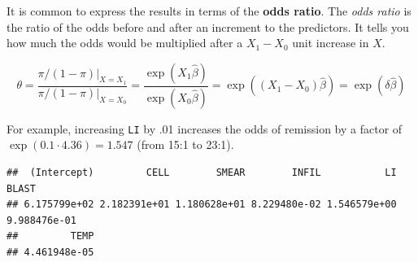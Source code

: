 \documentclass[
]{book}
\newenvironment{Shaded}{\begin{snugshade}}{\end{snugshade}}
\newcommand{\DataTypeTok}[1]{\textcolor[rgb]{0.13,0.29,0.53}{#1}}
\newcommand{\DecValTok}[1]{\textcolor[rgb]{0.00,0.00,0.81}{#1}}
\newcommand{\KeywordTok}[1]{\textcolor[rgb]{0.13,0.29,0.53}{\textbf{#1}}}
\newcommand{\NormalTok}[1]{#1}
\newcommand{\OperatorTok}[1]{\textcolor[rgb]{0.81,0.36,0.00}{\textbf{#1}}}
\newcommand{\StringTok}[1]{\textcolor[rgb]{0.31,0.60,0.02}{#1}}
\begin{document}
\begin{Shaded}
\end{Shaded}

It is common to express the results in terms of the \textbf{odds ratio}. The \emph{odds ratio} is the ratio of the odds before and after an increment to the predictors. It tells you how much the odds would be multiplied after a \(X_1 - X_0\) unit increase in \(X\).

\[\theta = \frac{\pi / (1 - \pi) |_{X = X_1}}{\pi / (1 - \pi) |_{X = X_0}} = \frac{\exp (X_1 \hat{\beta})}{\exp (X_0 \hat{\beta})} = \exp ((X_1-X_0) \hat{\beta}) = \exp (\delta \hat{\beta})\]

For example, increasing \texttt{LI} by .01 increases the odds of remission by a factor of \(\exp(0.1 \cdot 4.36) = 1.547\) (from 15:1 to 23:1).

\begin{Shaded}
\end{Shaded}

\begin{verbatim}
##  (Intercept)         CELL        SMEAR        INFIL           LI        BLAST 
## 6.175799e+02 2.182391e+01 1.180628e+01 8.229480e-02 1.546579e+00 9.988476e-01 
##         TEMP 
## 4.461948e-05
\end{verbatim}
\end{document}
